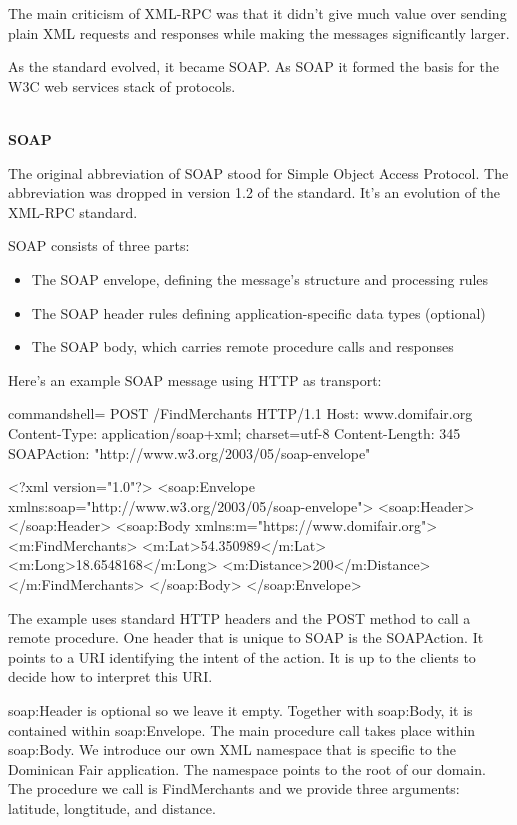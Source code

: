 The main criticism of XML-RPC was that it didn't give much value over sending plain XML requests and responses while making the messages significantly larger.

As the standard evolved, it became SOAP. As SOAP it formed the basis for the W3C web services stack of protocols.

\hspace*{\fill} \\ %
\noindent
\textbf{SOAP}

The original abbreviation of SOAP stood for Simple Object Access Protocol. The abbreviation was dropped in version 1.2 of the standard. It's an evolution of the XML-RPC standard.

SOAP consists of three parts:

\begin{itemize}
\item 
The SOAP envelope, defining the message's structure and processing rules

\item 
The SOAP header rules defining application-specific data types (optional)

\item 
The SOAP body, which carries remote procedure calls and responses
\end{itemize}

Here's an example SOAP message using HTTP as transport:

\begin{tcblisting}{commandshell={}}
POST /FindMerchants HTTP/1.1
Host: www.domifair.org
Content-Type: application/soap+xml; charset=utf-8
Content-Length: 345
SOAPAction: "http://www.w3.org/2003/05/soap-envelope"

<?xml version="1.0"?>
<soap:Envelope xmlns:soap="http://www.w3.org/2003/05/soap-envelope">
  <soap:Header>
  </soap:Header>
  <soap:Body xmlns:m="https://www.domifair.org">
    <m:FindMerchants>
      <m:Lat>54.350989</m:Lat>
      <m:Long>18.6548168</m:Long>
      <m:Distance>200</m:Distance>
    </m:FindMerchants>
  </soap:Body>
</soap:Envelope>
\end{tcblisting}

The example uses standard HTTP headers and the POST method to call a remote procedure. One header that is unique to SOAP is the SOAPAction. It points to a URI identifying the intent of the action. It is up to the clients to decide how to interpret this URI.

soap:Header is optional so we leave it empty. Together with soap:Body, it is contained within soap:Envelope. The main procedure call takes place within soap:Body. We introduce our own XML namespace that is specific to the Dominican Fair application. The namespace points to the root of our domain. The procedure we call is FindMerchants and we provide three arguments: latitude, longtitude, and distance.

